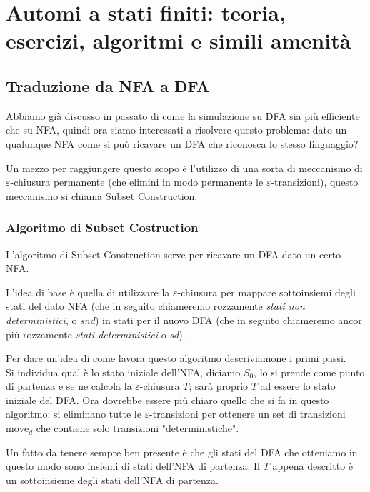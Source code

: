 \documentclass[class=book, crop=false, oneside, 12pt]{standalone}
\begin{document}
\chapter[Automi: teoria, esercizi, algoritmi e amenità]{Automi a stati finiti: teoria, esercizi, algoritmi e simili amenità}

\section{Traduzione da NFA a DFA}
Abbiamo già discusso in passato di come la simulazione su DFA sia più efficiente che su NFA, quindi ora siamo interessati a risolvere questo problema: dato un qualunque NFA come si può ricavare un DFA che riconosca lo stesso linguaggio?

Un mezzo per raggiungere questo scopo è l’utilizzo di una sorta di meccanismo di \(\varepsilon\)-chiusura permanente (che elimini in modo permanente le \(\varepsilon\)-transizioni), questo meccanismo si chiama Subset Construction.


\subsection{Algoritmo di Subset Costruction}
L’algoritmo di Subset Construction serve per ricavare un DFA dato un certo NFA.

L'idea di base è quella di utilizzare la \(\varepsilon\)-chiusura per mappare sottoinsiemi degli stati del dato NFA (che in seguito chiameremo rozzamente \emph{stati non deterministici}, o \emph{snd}) in stati per il nuovo DFA (che in seguito chiameremo ancor più rozzamente \emph{stati deterministici} o \emph{sd}).

Per dare un'idea di come lavora questo algoritmo descriviamone i primi passi.\\
Si individua qual è lo stato iniziale dell'NFA, diciamo \(S_0\), lo si prende come punto di partenza e se ne calcola la \(\varepsilon\)-chiusura \(T\); sarà proprio \(T\) ad essere lo stato iniziale del DFA. Ora dovrebbe essere più chiaro quello che si fa in questo algoritmo: si eliminano tutte le \(\varepsilon\)-transizioni per ottenere un set di transizioni \(\textrm{move}_d\) che contiene solo transizioni "deterministiche".

Un fatto da tenere sempre ben presente è che gli stati del DFA che otteniamo in questo modo sono insiemi di stati dell'NFA di partenza. Il \(T\) appena descritto è un sottoinsieme degli stati dell'NFA di partenza.
\end{document}

